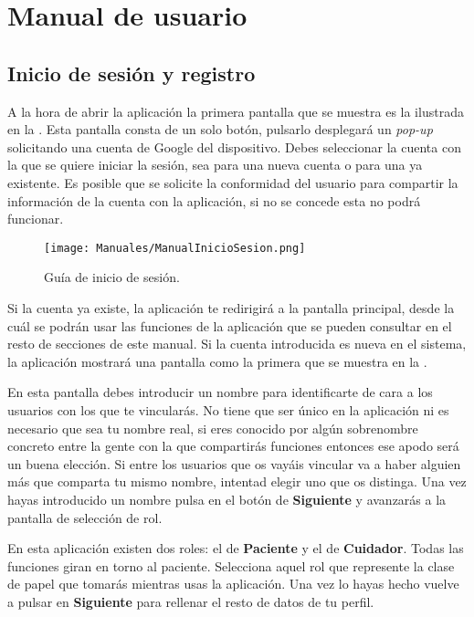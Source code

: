 \chapter{Manual de usuario}
\label{ch:manual_usuario}

\section{Inicio de sesión y registro}

A la hora de abrir la aplicación la primera pantalla que se muestra es la ilustrada en la . Esta pantalla consta de un solo botón, pulsarlo desplegará un \emph{pop-up} solicitando una cuenta de Google del dispositivo. Debes seleccionar la cuenta con la que se quiere iniciar la sesión, sea para una nueva cuenta o para una ya existente. Es posible que se solicite la conformidad del usuario para compartir la información de la cuenta con la aplicación, si no se concede esta no podrá funcionar. 

\begin{figure}[H]
    \centering
    \texttt{[image: Manuales/ManualInicioSesion.png]}
    \caption{Guía de inicio de sesión.}
    \label{man:inicio_sesion}
\end{figure}

Si la cuenta ya existe, la aplicación te redirigirá a la pantalla principal, desde la cuál se podrán usar las funciones de la aplicación que se pueden consultar en el resto de secciones de este manual. Si la cuenta introducida es nueva en el sistema, la aplicación mostrará una pantalla como la primera que se muestra en la .

En esta pantalla debes introducir un nombre para identificarte de cara a los usuarios con los que te vincularás. No tiene que ser único en la aplicación ni es necesario que sea tu nombre real, si eres conocido por algún sobrenombre concreto entre la gente con la que compartirás funciones entonces ese apodo será un buena elección. Si entre los usuarios que os vayáis vincular va a haber alguien más que comparta tu mismo nombre, intentad elegir uno que os distinga. Una vez hayas introducido un nombre pulsa en el botón de \textbf{Siguiente} y avanzarás a la pantalla de selección de rol.

En esta aplicación existen dos roles: el de \textbf{Paciente} y el de \textbf{Cuidador}. Todas las funciones giran en torno al paciente. Selecciona aquel rol que represente la clase de papel que tomarás mientras usas la aplicación. Una vez lo hayas hecho vuelve a pulsar en \textbf{Siguiente} para rellenar el resto de datos de tu perfil.

